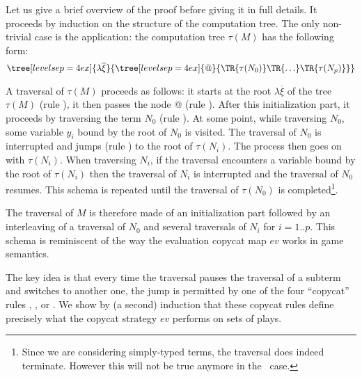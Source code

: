     Let us give a brief overview of the proof before giving it in full details.
    It proceeds by induction on the structure of the computation tree.
    The only non-trivial case is the application: the computation tree
    $\tau(M)$ has the following form:
        $$ \tree[levelsep=4ex]{\lambda \overline{\xi}}
            { \tree[levelsep=4ex]{@}
                {   \TR{\tau(N_0)} \TR{\ldots} \TR{\tau(N_p)}}}
        $$

    A traversal of $\tau(M)$ proceeds as follows: it starts at the root $\lambda \overline{\xi}$ of the tree $\tau(M)$ (rule ), it then passes the node @ (rule ).
    After this initialization part, it proceeds by traversing the term $N_0$ (rule ).
    At some point, while traversing $N_0$, some variable $y_i$ bound by the root of $N_0$ is visited. The traversal
    of $N_0$ is interrupted and jumps (rule ) to the root of $\tau(N_i)$. The process then goes on with $\tau(N_i)$.
    When traversing $N_i$, if the traversal encounters a variable bound by the root of $\tau(N_i)$ then the traversal of $N_i$
    is interrupted and
    the traversal of $N_0$ resumes.  This schema is repeated until the traversal of $\tau(N_0)$ is completed\footnote{Since we are considering
    simply-typed terms, the traversal does indeed terminate. However this will not be true anymore in the \pcf\ case.}.

    The traversal of $M$ is therefore made of an initialization part followed by an interleaving of a traversal of $N_0$ and
    several traversals of $N_i$ for $i=1..p$. This schema is reminiscent of the way the evaluation copycat map $ev$ works in game semantics.

    The key idea is that every time the traversal pauses the traversal of a subterm and switches to another one,
    the jump is permitted by one of the four ``copycat'' rules , ,  or .
    We show by (a second) induction that these copycat rules define precisely what the copycat strategy $ev$ performs on sets of plays.

